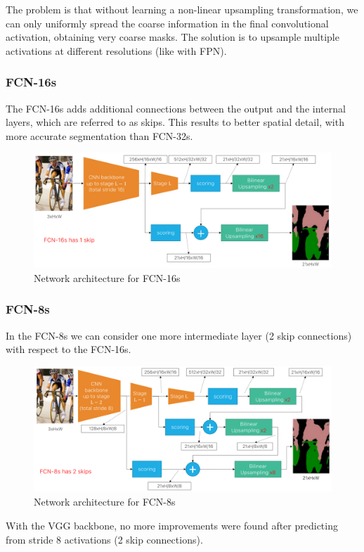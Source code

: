 The problem is that without learning a non-linear upsampling transformation, we can only uniformly spread the coarse information in the final convolutional activation, obtaining very coarse masks.
The solution is to upsample multiple activations at different resolutions (like with FPN).

\subsubsection{FCN-16s}
The FCN-16s adds additional connections between the output and the internal layers, which are referred to as skips.
This results to better spatial detail, with more accurate segmentation than FCN-32s.

\begin{figure}[htbp]
  \centering
  \includegraphics[width=0.8\linewidth]{./img/fcn16.png}
  \caption{Network architecture for FCN-16s}
\end{figure}

\subsubsection{FCN-8s}
In the FCN-8s we can consider one more intermediate layer (2 skip connections) with respect to the FCN-16s.

\begin{figure}[htbp]
  \centering
  \includegraphics[width=0.7\linewidth]{./img/fcn8.png}
  \caption{Network architecture for FCN-8s}
\end{figure}

With the VGG backbone, no more improvements were found after predicting from stride 8 activations (2 skip connections).

